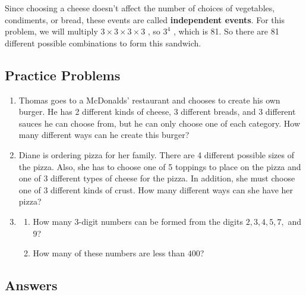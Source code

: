 Since choosing a cheese doesn't affect the number of choices of vegetables, condiments, or
bread, these events are called \textbf{independent events}. For this problem, we will
multiply $3\times3\times3\times3$ , so $3^4$ , which is 81. So there are 81 different
possible combinations to form this sandwich.




\subsection{Practice Problems}
\label{sss:prac-fe87}
\begin{enumerate}

\item Thomas goes to a McDonalds' restaurant and chooses to create his own burger. 
He has 2 different kinds of cheese, 3 different breads, and 3 different sauces he 
can choose from, but he can only choose one of each category. How many different 
ways can he create this burger?

\item Diane is ordering pizza for her family. There are 4 different possible sizes 
of the pizza. Also, she has to choose one of 5 toppings to place on the pizza and 
one of 3 different types of cheese for the pizza. In addition, she must choose one 
of 3 different kinds of crust. How many different ways can she have her pizza?

\item 
\begin{enumerate}
    \item How many 3-digit numbers can be formed from the digits 
    $2, 3, 4, 5, 7,$ and $9$?
    
    \item How many of these numbers are less than $400$?
\end{enumerate}

\end{enumerate}


\subsection{Answers}
\label{sss:answ-7894}




